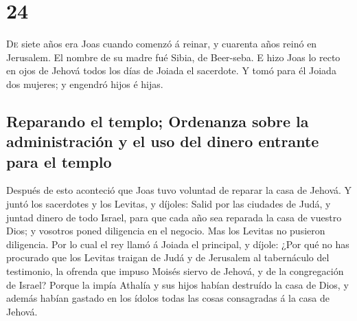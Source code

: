 \hypertarget{section-14-24}{%
\section{24}\label{section-14-24}}

 \textsc{De} siete años era Joas cuando comenzó á reinar,
y cuarenta años reinó en Jerusalem. El nombre de su madre fué Sibia, de
Beer-seba.  E hizo Joas lo recto en ojos de Jehová todos
los días de Joiada el sacerdote.  Y tomó para él Joiada
dos mujeres; y engendró hijos é hijas.

\hypertarget{reparando-el-templo-ordenanza-sobre-la-administraciuxf3n-y-el-uso-del-dinero-entrante-para-el-templo}{%
\subsection{Reparando el templo; Ordenanza sobre la administración y el
uso del dinero entrante para el
templo}\label{reparando-el-templo-ordenanza-sobre-la-administraciuxf3n-y-el-uso-del-dinero-entrante-para-el-templo}}

 Después de esto aconteció que Joas tuvo voluntad de
reparar la casa de Jehová.  Y juntó los sacerdotes y los
Levitas, y díjoles: Salid por las ciudades de Judá, y juntad dinero de
todo Israel, para que cada año sea reparada la casa de vuestro Dios; y
vosotros poned diligencia en el negocio. Mas los Levitas no pusieron
diligencia.  Por lo cual el rey llamó á Joiada el
principal, y díjole: ¿Por qué no has procurado que los Levitas traigan
de Judá y de Jerusalem al tabernáculo del testimonio, la ofrenda que
impuso Moisés siervo de Jehová, y de la congregación de Israel?
 Porque la impía Athalía y sus hijos habían destruído la
casa de Dios, y además habían gastado en los ídolos todas las cosas
consagradas á la casa de Jehová.

